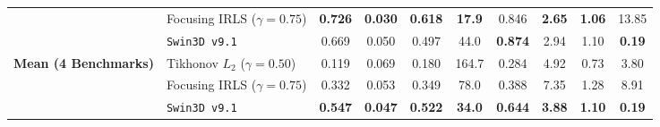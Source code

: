 \begin{table}[t]
{\begin{tabular}{llcccccccc}
 & Focusing IRLS ($\gamma=0.75$) & \textbf{0.726} & \textbf{0.030} & \textbf{0.618} & \textbf{17.9} & 0.846 & \textbf{2.65} & \textbf{1.06} & 13.85 \\
 & \texttt{Swin3D v9.1} & 0.669 & 0.050 & 0.497 & 44.0 & \textbf{0.874} & 2.94 & 1.10 & \textbf{0.19} \\
\midrule
\multirow{3}{*}{\textbf{Mean (4 Benchmarks)}} & Tikhonov $L_2$ ($\gamma=0.50$) & 0.119 & 0.069 & 0.180 & 164.7 & 0.284 & 4.92 & 0.73 & 3.80 \\
 & Focusing IRLS ($\gamma=0.75$) & 0.332 & 0.053 & 0.349 & 78.0 & 0.388 & 7.35 & 1.28 & 8.91 \\
 & \texttt{Swin3D v9.1} & \textbf{0.547} & \textbf{0.047} & \textbf{0.522} & \textbf{34.0} & \textbf{0.644} & \textbf{3.88} & \textbf{1.10} & \textbf{0.19} \\
\bottomrule
\end{tabular}%
}
\end{table}

